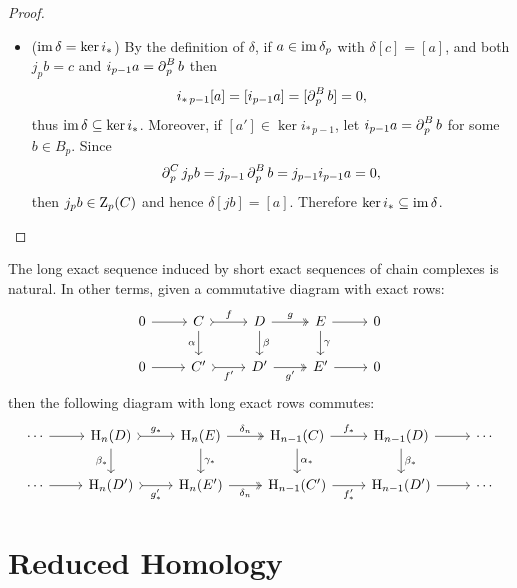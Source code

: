 \begin{proof}
\begin{itemize}
\item (\(\operatorname{im} \delta = \ker i_{*}\))  By the definition of \(\delta\), if \(a \in \operatorname{im} \delta_p\)
  with \(\delta[c] = [a]\), and both \(j_p b = c\) and \(i_{p-1} a = \operatorname{\partial}_p^B b\) then
  \[
  i_{*\, p-1}[a] = [i_{p-1} a] = [\operatorname{\partial}_p^B b] = 0,
  \]
  thus \(\operatorname{im} \delta \subseteq \ker i_{*}\). Moreover, if \([a'] \in \ker i_{*\, p-1}\), let
  \(i_{p-1} a = \operatorname{\partial}_p^B b\) for some \(b \in B_p\). Since
  \[
  \operatorname{\partial}_p^C j_p b = j_{p-1} \operatorname{\partial}_p^B b = j_{p-1} i_{p-1} a = 0,
  \]
  then \(j_p b \in \operatorname{Z}_p(C)\) and hence \(\delta[j b] = [a]\). Therefore
  \(\ker i_{*} \subseteq \operatorname{im} \delta\).
\end{itemize}
\end{proof}

\begin{proposition}
\label{prop:long-exact-sequence-construction-is-natural}
The long exact sequence induced by short exact sequences of chain complexes is
natural. In other terms, given a commutative diagram with exact rows:
\[
\begin{tikzcd}
0 \ar[r]
&C \ar[r, "f", tail] \ar[d, "\alpha"']
&D \ar[r, "g", two heads] \ar[d, "\beta"]
&E \ar[r] \ar[d, "\gamma"]
&0
\\
0 \ar[r]
&C' \ar[r, "f'"', tail]
&D' \ar[r, "g'"', two heads]
&E' \ar[r]
&0
\end{tikzcd}
\]
then the following diagram with long exact rows commutes:
\[
\begin{tikzcd}
\cdots \ar[r]
&\Hmlg_n(D) \ar[r, "g_{*}", tail] \ar[d, "\beta_{*}"']
&\Hmlg_n(E) \ar[r, "\delta_n", two heads] \ar[d, "\gamma_{*}"]
&\Hmlg_{n-1}(C) \ar[r, "f_{*}"] \ar[d, "\alpha_{*}"]
&\Hmlg_{n-1}(D) \ar[r] \ar[d, "\beta_{*}"]
&\cdots
\\
\cdots \ar[r]
&\Hmlg_n(D') \ar[r, "g_{*}'"', tail]
&\Hmlg_n(E') \ar[r, "\delta_n"', two heads]
&\Hmlg_{n-1}(C') \ar[r, "f_{*}'"']
&\Hmlg_{n-1}(D') \ar[r]
&\cdots
\end{tikzcd}
\]
\end{proposition}


\section{Reduced Homology}

